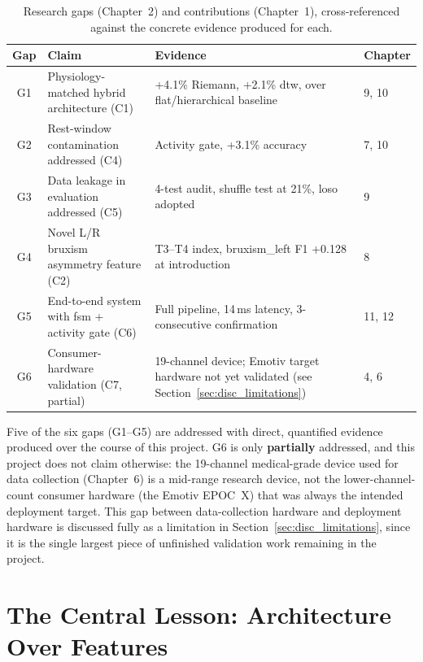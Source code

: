 \begin{table}[htbp]
\centering
\caption{Research gaps (Chapter~2) and contributions (Chapter~1),
cross-referenced against the concrete evidence produced for each.}
\label{tab:gaps_delivered}
\renewcommand{\arraystretch}{1.35}
\begin{tabular}{c p{3.6cm} p{3.0cm} p{3.0cm}}
\toprule
\textbf{Gap} & \textbf{Claim} & \textbf{Evidence} &
\textbf{Chapter} \\
\midrule
G1 & Physiology-matched hybrid architecture (C1) & +4.1\% Riemann,
    +2.1\% \acrshort{dtw}, over flat/hierarchical baseline & 9, 10 \\
G2 & Rest-window contamination addressed (C4) & Activity gate,
    +3.1\% accuracy & 7, 10 \\
G3 & Data leakage in evaluation addressed (C5) & 4-test audit,
    shuffle test at 21\%, \acrshort{loso} adopted & 9 \\
G4 & Novel L/R bruxism asymmetry feature (C2) & T3--T4 index,
    bruxism\_left F1 +0.128 at introduction & 8 \\
G5 & End-to-end system with \acrshort{fsm} + activity gate (C6) &
    Full pipeline, 14\,ms latency, 3-consecutive confirmation &
    11, 12 \\
G6 & Consumer-hardware validation (C7, partial) & 19-channel
    device; Emotiv target hardware not yet validated (see
    Section~\ref{sec:disc_limitations}) & 4, 6 \\
\bottomrule
\end{tabular}
\end{table}

Five of the six gaps (G1--G5) are addressed with direct, quantified
evidence produced over the course of this project. G6 is only
\textbf{partially} addressed, and this project does not claim
otherwise: the 19-channel medical-grade device used for data
collection (Chapter~6) is a mid-range research device, not the
lower-channel-count consumer hardware (the Emotiv EPOC~X) that was
always the intended deployment target. This gap between
data-collection hardware and deployment hardware is discussed fully
as a limitation in Section~\ref{sec:disc_limitations}, since it is
the single largest piece of unfinished validation work remaining in
the project.

\section{The Central Lesson: Architecture Over Features}
\label{sec:disc_metalesson}


